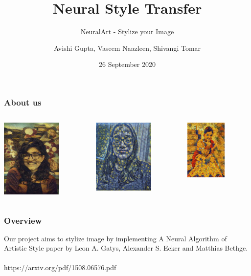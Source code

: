 \documentclass[14pt]{beamer}
\title[NST]{Neural Style Transfer}
\subtitle{NeuralArt - Stylize your Image}
\author[]{Avishi Gupta, Vaseem Naazleen, Shivangi Tomar}
\date{26 September 2020}
\begin{document}
\bgroup
{}
\begin{frame}[plain]{}
\end{frame}
\egroup


\begin{frame}
   \titlepage
\end{frame}

\begin{frame}
    \frametitle{About us}
    \begin{columns}
        \begin{column}{0.33\textwidth}
            \includegraphics[width=30mm]{avishi.jpg}
        \end{column}
        \begin{column}{0.33\textwidth}
            \includegraphics[width=30mm]{sshivangi.jpg} 
        \end{column}
        \begin{column}{0.33\textwidth}
            \includegraphics[width=20mm]{vnaaz.jpg}
        \end{column}
    \end{columns}
\end{frame}

\begin{frame}
		\frametitle{Overview}
		Our project aims to stylize image by implementing A Neural Algorithm of Artistic Style paper by Leon A. Gatys, Alexander S. Ecker and Matthias Bethge. \\~\\

		https://arxiv.org/pdf/1508.06576.pdf
\end{frame}
\end{document}

